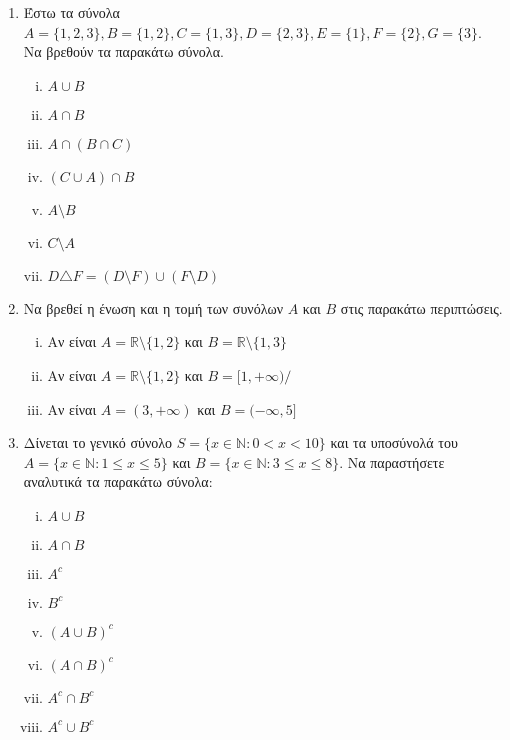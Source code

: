 


\pagestyle{askhseis}



\begin{center}
  \minibox{\large\bfseries \textcolor{Col1}{Ασκήσεις στα Σύνολα}}
\end{center}

\vspace{\baselineskip}

\begin{enumerate}

\item Έστω τα σύνολα $A=\{1,2,3\}, B=\{1,2\}, C=\{1,3\}, D=\{2,3\}, E=\{1\}, F=\{2\}, G=\{3\}$. Να βρεθούν τα παρακάτω σύνολα.

\begin{enumerate}[i)]

\item $A\cup B$
\item $A\cap B$
\item $A\cap (B\cap C)$
\item $(C\cup A)\cap B$
\item $A\setminus B$
\item $C\setminus A$
\item $D\triangle F = (D\setminus F)\cup(F\setminus D)$
\end{enumerate}

\item Να βρεθεί η ένωση και η τομή των συνόλων $A$ και $B$ στις παρακάτω περιπτώσεις.

\begin{enumerate}[i)]

\item Αν είναι $A=\mathbb{R}\setminus\{1,2\}$ και $B=\mathbb{R}\setminus\{1,3\}$
\item Αν είναι $A=\mathbb{R}\setminus\{1,2\}$ και $B=[1,+\infty)/$
\item Αν είναι $A=(3,+\infty)$ και $B=(-\infty,5]$
\end{enumerate}

\item Δίνεται το γενικό σύνολο $S=\{x\in \mathbb{N} : 0<x<10\}$ και τα υποσύνολά του $A=\{x\in \mathbb{N} : 1\leq x\leq 5\}$ και $B=\{x\in \mathbb{N} : 3\leq x\leq 8\}$. Να παραστήσετε αναλυτικά τα παρακάτω σύνολα:

\begin{enumerate}[i)]

\item $A\cup B$
\item $A\cap B$
\item $A^c$
\item $B^c$
\item $(A\cup B)^c$
\item $(A\cap B)^c$
\item $A^c\cap B^c$
\item $A^c\cup B^c$
\end{enumerate}



\end{enumerate}





